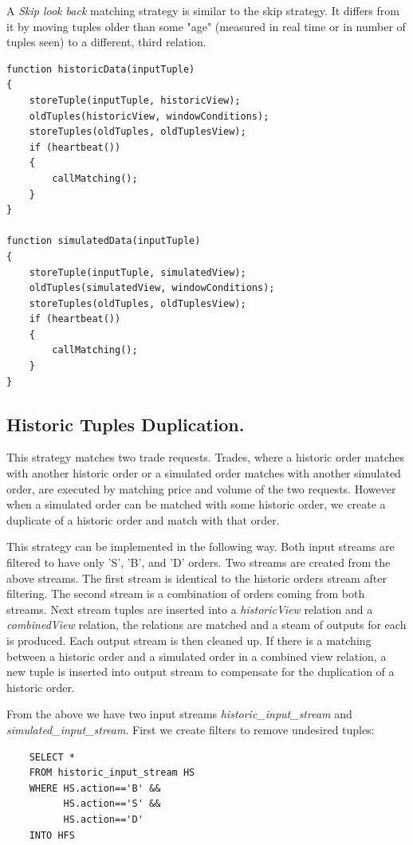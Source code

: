 \documentclass{article}
\begin{document}
\noindent A \emph{Skip look back} matching strategy is similar to the skip strategy. It differs from it by moving tuples older than some "age" (measured in real time or in number of tuples seen) to a different, third relation.
\begin{verbatim}   
function historicData(inputTuple)
{
    storeTuple(inputTuple, historicView);
    oldTuples(historicView, windowConditions);
    storeTuples(oldTuples, oldTuplesView);
    if (heartbeat())
    {
        callMatching();
    }
}

function simulatedData(inputTuple)
{
    storeTuple(inputTuple, simulatedView);
    oldTuples(simulatedView, windowConditions);
    storeTuples(oldTuples, oldTuplesView);
    if (heartbeat())
    {
        callMatching();
    }
}
\end{verbatim}


\subsection{Historic Tuples Duplication.}

This strategy matches two trade requests. Trades, where a historic order matches with another historic order or a simulated order matches with another simulated order, are executed by matching price and volume of the two requests. However when a simulated order can be matched with some historic order, we create a duplicate of a historic order and match with that order.

This strategy can be implemented in the following way. Both input streams are filtered to have only 'S', 'B', and 'D' orders. Two streams are created from the above streams. The first stream is identical to the historic orders stream after filtering. The second stream is a combination of orders coming from both streams. Next stream tuples are inserted into a \emph{historicView} relation and a \emph{combinedView} relation, the relations are matched and a steam of outputs for each is produced. Each output stream is then cleaned up. If there is a matching between a historic order and a simulated order in a combined view relation, a new tuple is inserted into output stream to compensate for the duplication of a historic order.

From the above we have two input streams \emph{historic\_input\_stream} and \emph{simulated\_input\_stream}. First we create filters to remove undesired tuples:

\begin{verbatim}   
    SELECT * 
    FROM historic_input_stream HS
    WHERE HS.action=='B' &&
          HS.action=='S' &&
          HS.action=='D'
    INTO HFS
\end{verbatim}
\end{document}
